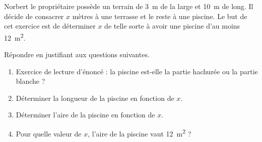 
\begin{exercice}\label{exosmath-0981}

    Norbert le propriétaire possède un terrain de \SI{3}{\meter} de la large et \SI{10}{\meter} de long. Il décide de consacrer \( x\) mètres à une terrasse et le reste à une piscine. Le but de cet exercice est de déterminer \( x\) de telle sorte à avoir une piscine d'au moins \SI{12}{\meter\squared}.

\begin{center}
   
\end{center}


Répondre en justifiant aux questions suivantes.
\begin{enumerate}
    \item
        Exercice de lecture d'énoncé : la piscine est-elle la partie hachurée ou la partie blanche ?
    \item
        Déterminer la longueur de la piscine en fonction de \( x\).
    \item
        Déterminer l'aire de la piscine en fonction de \( x\).
    \item
        Pour quelle valeur de \( x\), l'aire de la piscine vaut \SI{12}{\meter\squared} ?
\end{enumerate}


\end{exercice}
